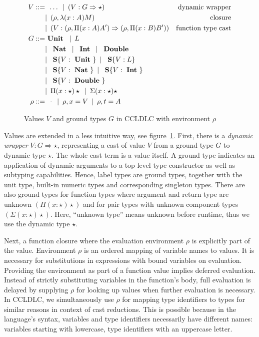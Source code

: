 \begin{figure}
\begin{align*}
 V ::= & \enspace \dots \enspace
        |\enspace (V : G \Rightarrow \star) & \text{dynamic wrapper}\\
      & |\enspace (\rho, \lambda(x:A)M) & \text{closure} \\
      & |\enspace (V : (\rho, \Pi(x:A) A') \Rightarrow (\rho, \Pi(x:B) B') ) & \text{function type cast} \\
 G ::= & \text{ \textbf{Unit} } \enspace|\enspace
    L \\
    & |\enspace \text{ \textbf{Nat} } \enspace|\enspace \text{ \textbf{Int} } \enspace|\enspace \text{ \textbf{Double} } \\
    & |\enspace \text{ \textbf{S}}\{V: \text{ \textbf{Unit} }\} \enspace|\enspace \text{ \textbf{S}}\{V: L\} \\
    & |\enspace \text{ \textbf{S}}\{V: \text{ \textbf{Nat} }\} \enspace|\enspace \text{ \textbf{S}}\{V: \text{ \textbf{Int} }\} \\ 
    & |\enspace \text{ \textbf{S}}\{V: \text{ \textbf{Double} }\} \\
    & |\enspace
    \Pi(x:\star)\star \enspace|\enspace
    \Sigma(x:\star)\star \\
 \rho ::= & \enspace \cdot \enspace|\enspace \rho, x = V  \enspace|\enspace \rho,t = A
\end{align*}
\caption[Values $V$ and ground types $G$ in CCLDLC]{Values $V$ and ground types $G$ in CCLDLC with environment $\rho$}
\label{fig:ccldlc-extensions-values}
\end{figure}

Values are extended in a less intuitive way, see figure~\ref{fig:ccldlc-extensions-values}. First, there is a \emph{dynamic wrapper} $V : G \Rightarrow \star$, representing a cast of value $V$ from a ground type $G$ to dynamic type $\star$. The whole cast term is a value itself. A ground type indicates an application of dynamic arguments to a top level type constructor as well as subtyping capabilities. Hence, label types are ground types, together with the unit type, built-in numeric types and corresponding singleton types. There are also ground types for function types where argument and return type are unknown $(\Pi(x:\star)\star)$ and for pair types with unknown component types $(\Sigma(x:\star)\star)$. Here, ``unknown type'' means unknown before runtime, thus we use the dynamic type $\star$.

Next, a function closure where the evaluation environment $\rho$ is explicitly part of the value. Environment $\rho$ is an ordered mapping of variable names to values. It is necessary for substitutions in expressions with bound variables on evaluation. Providing the environment as part of a function value implies deferred evaluation. Instead of strictly substituting variables in the function's body, full evaluation is delayed by supplying $\rho$ for looking up values when further evaluation is necessary. In CCLDLC, we simultaneously use $\rho$ for mapping type identifiers to types for similar reasons in context of cast reductions. This is possible because in the language's syntax, variables and type identifiers necessarily have different names: variables starting with lowercase, type identifiers with an uppercase letter.

